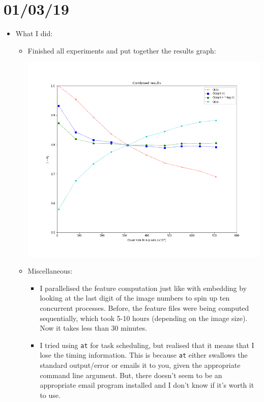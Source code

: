 \documentclass[11pt,a4paper]{report}
\begin{document}
\section{01/03/19}

\begin{itemize}

  \item What I did:
    \begin{itemize}
      \item Finished all experiments and put together the results graph:
        \begin{center}
          \includegraphics[width=\linewidth]{combined_graph_27_02_2019.png}
        \end{center}
      \item Miscellaneous:
        \begin{itemize}
          \item I parallelised the feature computation just like with embedding by looking at the last digit of the image numbers to spin up ten concurrent processes. Before, the feature files were being computed sequentially, which took 5-10 hours (depending on the image size). Now it takes less than 30 minutes.
          \item I tried using \texttt{at} for task scheduling, but realised that it means that I lose the timing information. This is because \texttt{at} either swallows the standard output/error or emails it to you, given the appropriate command line argument. But, there doesn't seem to be an appropriate email program installed and I don't know if it's worth it to use.

\end{itemize}
\end{itemize}
\end{itemize}
\end{document}
